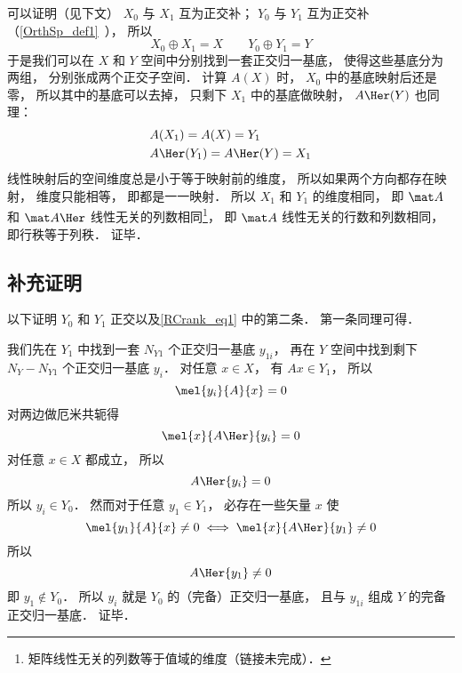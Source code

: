 可以证明（见下文） $X_0$ 与 $X_1$ 互为正交补； $Y_0$ 与 $Y_1$ 互为正交补（\autoref{OrthSp_def1}~）， 所以
\begin{equation}\label{RCrank_eq1}
X_0 \oplus X_1 = X
\qquad
Y_0 \oplus Y_1 = Y
\end{equation}
于是我们可以在 $X$ 和 $Y$ 空间中分别找到一套正交归一基底， 使得这些基底分为两组， 分别张成两个正交子空间． 计算 $A(X)$ 时， $X_0$ 中的基底映射后还是零， 所以其中的基底可以去掉， 只剩下 $X_1$ 中的基底做映射， $A\Her(Y)$ 也同理：
\begin{equation}
\begin{aligned}
&A(X_1) = A(X) = Y_1\\
&A\Her(Y_1) = A\Her(Y) = X_1
\end{aligned}
\end{equation}
线性映射后的空间维度总是小于等于映射前的维度， 所以如果两个方向都存在映射， 维度只能相等， 即都是一一映射． 所以 $X_1$ 和 $Y_1$ 的维度相同， 即 $\mat A$ 和 $\mat A\Her$ 线性无关的列数相同\footnote{矩阵线性无关的列数等于值域的维度（链接未完成）．}， 即 $\mat A$ 线性无关的行数和列数相同， 即行秩等于列秩． 证毕．

\subsection{补充证明}
以下证明 $Y_0$ 和 $Y_1$ 正交以及\autoref{RCrank_eq1} 中的第二条． 第一条同理可得．

我们先在 $Y_1$ 中找到一套 $N_{Y1}$ 个正交归一基底 ${y_{1i}}$， 再在 $Y$ 空间中找到剩下 $N_Y - N_{Y1}$ 个正交归一基底 ${y_i}$． 对任意 ${x} \in X$， 有 $A {x} \in Y_1$， 所以
\begin{equation}
\mel{y_i}{A}{x} = 0
\end{equation}
对两边做厄米共轭得%
\begin{equation}
\mel{x}{A\Her}{y_i} = 0
\end{equation}
对任意 ${x}\in X$ 都成立， 所以
\begin{equation}
A\Her{y_i} = 0
\end{equation}
所以 ${y_i} \in Y_0$． 然而对于任意 ${y_1} \in Y_1$， 必存在一些矢量 ${x}$ 使
\begin{equation}
\mel{y_1}{A}{x} \ne 0
\iff
\mel{x}{A\Her}{y_1} \ne 0
\end{equation}
所以
\begin{equation}
A\Her{y_1} \ne 0
\end{equation}
即 ${y_1} \notin Y_0$． 所以 ${y_i}$ 就是 $Y_0$ 的（完备）正交归一基底， 且与 ${y_{1i}}$ 组成 $Y$ 的完备正交归一基底． 证毕．
